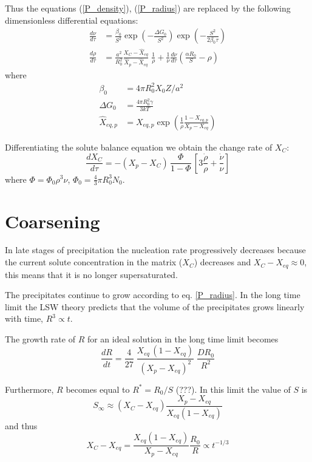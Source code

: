 \documentclass[12pt,a4paper]{article}
\begin{document}
Thus the equations (\ref{P_density}), (\ref{P_radius}) are replaced by the following dimensionless differential equations:
\begin{align}
\frac{d\nu}{d\tau} &= 
\frac{\beta_0}{S^2} 
\exp\left( -\frac{\Delta G_0}{S^2}\right)  
\exp\left( -\frac{S^2}{2\beta_0 \tau}\right)  \\
\frac{d\rho}{d\tau} &=  
\frac{a^2}{R_0^2} 
\frac{X_C - \hat{X}_{eq}}{\hat{X}_p - \hat{X}_{eq}} 
\; \frac{1}{\rho}
+ 
\frac{1}{\nu}\frac{d\nu}{d\tau}
\left( \frac{\alpha R_0}{S} - \rho \right)
\end{align}
where
\begin{align}
\beta_0 &= 4\pi R_0^2 X_{0}Z / a^2 \\
\Delta G_0 &= \frac{4\pi R_0^2 \gamma }{3kT}  \\
\hat{X}_{eq,p} &= X_{eq,p} \exp 
\left( \frac{1}{\rho} \frac{1-X_{eq,p}}{X_p - X_{eq}}\right)
\end{align}

Differentiating the solute balance equation we obtain the change rate of $X_C$:
\begin{equation}
\frac{dX_C}{d\tau} = -(X_p - X_C)\, \frac{\Phi}{1-\Phi} \,
\left[ 3\frac{\dot{\rho}}{\rho} + \frac{\dot{\nu}}{\nu} \right]
\end{equation}
where $\Phi = \Phi_0 \rho^3 \nu$, $\Phi_0 = \frac{4}{3}\pi R_0^3 N_0$.


\section{Coarsening}
In late stages of precipitation the nucleation rate progressively decreases because the current solute concentration in the matrix ($X_C$) decreases and $X_C - X_{eq} \approx 0$, this means that it is no longer supersaturated. 

The precipitates continue to grow according to eq. \eqref{P_radius}. In the long time limit the LSW theory predicts that the volume of the precipitates grows linearly with time, $R^3 \propto t$.

The growth rate of $R$ for an ideal solution in the long time limit becomes \citep{Calderon-1994-Ostwaldripeningin}
\begin{equation}
\label{R_coarsening}
\frac{dR}{dt} = \frac{4}{27}
\;\frac{X_{eq}\, (1-X_{eq})}{(X_{p} - X_{eq} )^2}
\;\frac{D R_0}{R^2}
\end{equation}

Furthermore, $R$ becomes equal to $R^*=R_0/S$ \citep{Deschamps-1998-Influenceofpredefo} (???). In this limit the value of $S$ is
\begin{equation}
S_\infty \approx (X_C-X_{eq}) \frac{X_p-X_{eq}}{X_{eq}(1-X_{eq})}
\end{equation}
and thus
\begin{equation}
X_C - X_{eq} = \frac{X_{eq}(1-X_{eq})}{X_p-X_{eq}} \frac{R_0}{R} \propto t^{-1/3}
\end{equation}
\end{document}
